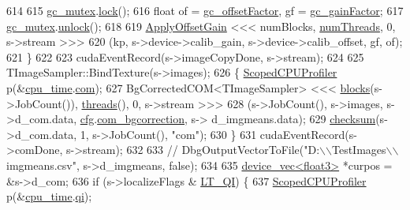 \begin{DoxyCode}
{{614 
615         \hyperlink{class_queued_c_u_d_a_tracker_aea7843385e4604dc38a6f1fc7b4f2811}{gc\_mutex}.\hyperlink{struct_threads_1_1_mutex_af3cb09072ecd935be502deb78f4519d5}{lock}();
616         \textcolor{keywordtype}{float} of = \hyperlink{class_queued_c_u_d_a_tracker_a84b6dcf09baa64ba031f7a5a4304d592}{gc\_offsetFactor}, gf = \hyperlink{class_queued_c_u_d_a_tracker_adba93271c22f7e6800f49ab93ec07c71}{gc\_gainFactor};
617         \hyperlink{class_queued_c_u_d_a_tracker_aea7843385e4604dc38a6f1fc7b4f2811}{gc\_mutex}.\hyperlink{struct_threads_1_1_mutex_ad78fadce2239c6d359986e443822f6f6}{unlock}();
618 
619         \hyperlink{group__kernels_ga45301d4799d0b58381ecd58202724298}{ApplyOffsetGain} <<< numBlocks, \hyperlink{class_queued_c_u_d_a_tracker_a1bbaf466f197bd745411786578b743bc}{numThreads}, 0, s->stream >>>    
620             (kp, s->device->calib\_gain, s->device->calib\_offset, gf, of);
621     \}
622 
623     cudaEventRecord(s->imageCopyDone, s->stream);
624 
625     TImageSampler::BindTexture(s->images);
626     \{ \hyperlink{class_scoped_c_p_u_profiler}{ScopedCPUProfiler} p(&\hyperlink{class_queued_c_u_d_a_tracker_ae8b2eeef65a2a1acde697df6c206ae08}{cpu\_time}.\hyperlink{struct_queued_c_u_d_a_tracker_1_1_kernel_profile_time_a9f9415edf045228fd79007621df104c1}{com});
627         BgCorrectedCOM<TImageSampler> <<< \hyperlink{class_queued_c_u_d_a_tracker_a935e85ca846ef768ffeca1ff4a23ab21}{blocks}(s->JobCount()), \hyperlink{class_queued_c_u_d_a_tracker_ae88c5554dba8227967f4a600ff7fab84}{threads}(), 0, s->stream >>> 
628             (s->JobCount(), s->images, s->d\_com.data, \hyperlink{class_queued_tracker_afb847e7f49e0af6027d58af51d5914dc}{cfg}.\hyperlink{struct_q_trk_settings_a18ce353ffb049d1c86254a773a6fe49d}{com\_bgcorrection}, s->
      d\_imgmeans.data);
629         \hyperlink{_queued_c_u_d_a_tracker_8cu_a92f77d4c98e5e45869270339e47aa069}{checksum}(s->d\_com.data, 1, s->JobCount(), \textcolor{stringliteral}{"com"});
630     \}
631     cudaEventRecord(s->comDone, s->stream);
632 
633     \textcolor{comment}{// DbgOutputVectorToFile("D:\(\backslash\)\(\backslash\)TestImages\(\backslash\)\(\backslash\)imgmeans.csv", s->d\_imgmeans, false);}
634 
635     \hyperlink{classdevice__vec}{device\_vec<float3>} *curpos = &s->d\_com;
636     \textcolor{keywordflow}{if} (s->localizeFlags & \hyperlink{qtrk__c__api_8h_a9d32512eae44894026802d1a688c7e3ba9eb0441a0c1e1086ff81512ea509e564}{LT\_QI}) \{
637         \hyperlink{class_scoped_c_p_u_profiler}{ScopedCPUProfiler} p(&\hyperlink{class_queued_c_u_d_a_tracker_ae8b2eeef65a2a1acde697df6c206ae08}{cpu\_time}.\hyperlink{struct_queued_c_u_d_a_tracker_1_1_kernel_profile_time_af6247f72c0dea94c0a3edbb373476741}{qi});
}}
\end{DoxyCode}
